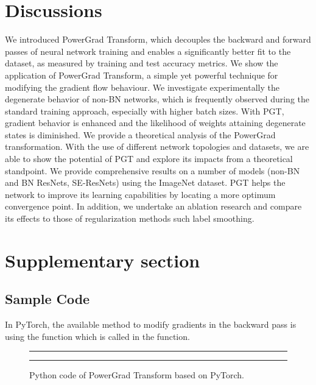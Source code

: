 \documentclass[times,sort&compress]{elsarticle}
\begin{document}
\section{Discussions}
\label{sec:Disc}


We introduced PowerGrad Transform, which decouples the backward and forward passes of
neural network training and enables a significantly better fit to the dataset, as
measured by training and test accuracy metrics. We show the application of PowerGrad
Transform, a simple yet powerful technique for modifying the gradient flow behaviour. We
investigate experimentally the degenerate behavior of non-BN networks, which is
frequently observed during the standard training approach, especially with higher batch
sizes. With PGT, gradient behavior is enhanced and the likelihood of weights attaining
degenerate states is diminished. We provide a theoretical analysis of the PowerGrad
transformation. With the use of different network topologies and datasets, we are able
to show the potential of PGT and explore its impacts from a theoretical standpoint. We
provide comprehensive results on a number of models (non-BN and BN ResNets, SE-ResNets)
using the ImageNet dataset. PGT helps the network to improve its learning capabilities
by locating a more optimum convergence point. In addition, we undertake an ablation
research and compare its effects to those of regularization methods such label
smoothing.






\newpage

\section{Supplementary section}
\label{sec:Supp}




\subsection{Sample Code}

In PyTorch, the available method to modify gradients in the backward pass is using the
 function which is called in the  function.

\begin{figure}[h] \hrule  \hrule
\vspace{0.1cm} \caption{Python code of PowerGrad Transform based on PyTorch. }
\label{fig:code}
\end{figure}
\end{document}
